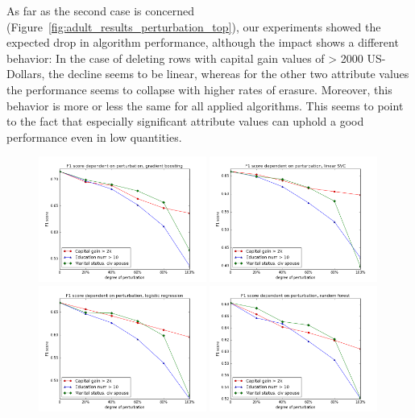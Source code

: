 \documentclass{llncs}
\begin{document}
As far as the second case is concerned (Figure~\ref{fig:adult_results_perturbation_top}), our experiments showed the expected drop in algorithm performance, although the impact shows a different behavior: In the case of deleting rows with capital gain values of > 2000 US-Dollars, the decline seems to be linear, whereas for the other two attribute values the performance seems to collapse with higher rates of erasure. Moreover, this behavior is more or less the same for all applied algorithms. This seems to point to the fact that especially significant attribute values can uphold a good performance even in low quantities.


\begin{figure}[!t]
	\begin{center}
		\includegraphics[width=0.49\textwidth]{figures/results/perturb_gradient_boost}
		\includegraphics[width=0.49\textwidth]{figures/results/perturb_linear_svc}
		\includegraphics[width=0.49\textwidth]{figures/results/perturb_logistic_regression}
		\includegraphics[width=0.49\textwidth]{figures/results/perturb_random_forest}

\end{center}
\end{figure}
\end{document}

